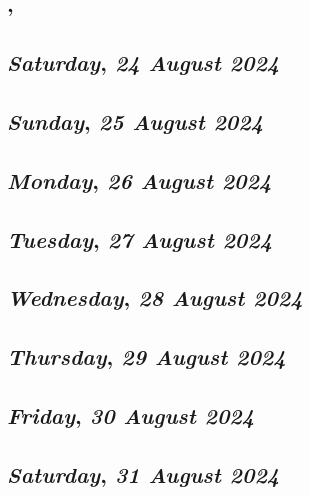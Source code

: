 \subsection*{\weekday, \day}

\def\day{\textit{24 August 2024}}
\def\weekday{\textit{Saturday}}
\subsection*{\weekday, \day}

\def\day{\textit{25 August 2024}}
\def\weekday{\textit{Sunday}}
\subsection*{\weekday, \day}

\def\day{\textit{26 August 2024}}
\def\weekday{\textit{Monday}}
\subsection*{\weekday, \day}

\def\day{\textit{27 August 2024}}
\def\weekday{\textit{Tuesday}}
\subsection*{\weekday, \day}

\def\day{\textit{28 August 2024}}
\def\weekday{\textit{Wednesday}}
\subsection*{\weekday, \day}

\def\day{\textit{29 August 2024}}
\def\weekday{\textit{Thursday}}
\subsection*{\weekday, \day}

\def\day{\textit{30 August 2024}}
\def\weekday{\textit{Friday}}
\subsection*{\weekday, \day}

\def\day{\textit{31 August 2024}}
\def\weekday{\textit{Saturday}}
\subsection*{\weekday, \day}
